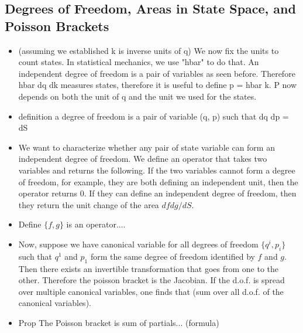 \documentclass{article}
\begin{document}
\subsection{Degrees of Freedom, Areas in State Space, and Poisson Brackets}
\begin{itemize}
	
	\item (assuming we established k is inverse units of q) We now fix the units to count states. In statistical mechanics, we use "hbar" to do that. An independent degree of freedom is a pair of variables as seen before. Therefore hbar dq dk measures states, therefore it is useful to define p = hbar k. P now depends on both the unit of q and the unit we used for the states.
	
	\item definition a degree of freedom is a pair of variable (q, p) such that dq dp = dS
	
	\item We want to characterize whether any pair of state variable can form an independent degree of freedom. We define an operator that takes two variables and returns the following. If the two variables cannot form a degree of freedom, for example, they are both defining an independent unit, then the operator returns 0. If they can define an independent degree of freedom, then they return the unit change of the area $df dg/dS$.
	
	\item Define $\{ f , g\}$ is an operator....
	
	\item Now, suppose we have canonical variable for all degrees of freedom $\{q^i, p_i\}$ such that $q^1$ and $p_1$ form the same degree of freedom identified by $f$ and $g$. Then there exists an invertible transformation that goes from one to the other. Therefore the poisson bracket is the Jacobian. If the d.o.f. is spread over multiple canonical variables, one finds that (sum over all d.o.f. of the canonical variables).
	
	\item Prop The Poisson bracket is sum of partials... (formula)
\end{itemize}
\end{document}
